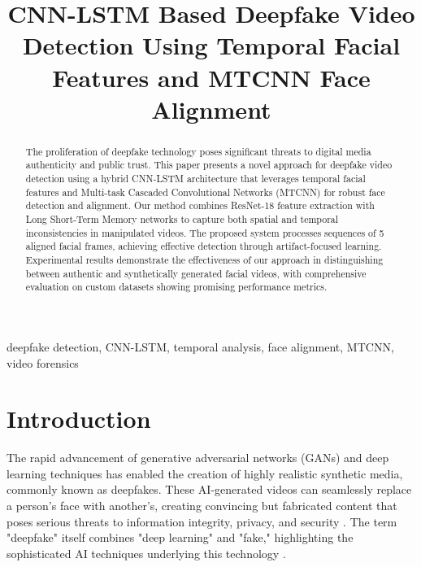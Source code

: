 \documentclass[conference]{IEEEtran}
\begin{document}
\title{CNN-LSTM Based Deepfake Video Detection Using Temporal Facial Features and MTCNN Face Alignment}

\author{
}

\maketitle

\begin{abstract}
The proliferation of deepfake technology poses significant threats to digital media authenticity and public trust. This paper presents a novel approach for deepfake video detection using a hybrid CNN-LSTM architecture that leverages temporal facial features and Multi-task Cascaded Convolutional Networks (MTCNN) for robust face detection and alignment. Our method combines ResNet-18 feature extraction with Long Short-Term Memory networks to capture both spatial and temporal inconsistencies in manipulated videos. The proposed system processes sequences of 5 aligned facial frames, achieving effective detection through artifact-focused learning. Experimental results demonstrate the effectiveness of our approach in distinguishing between authentic and synthetically generated facial videos, with comprehensive evaluation on custom datasets showing promising performance metrics.
\end{abstract}

\begin{IEEEkeywords}
deepfake detection, CNN-LSTM, temporal analysis, face alignment, MTCNN, video forensics
\end{IEEEkeywords}

\section{Introduction}

The rapid advancement of generative adversarial networks (GANs) \cite{goodfellow2014generative} and deep learning techniques has enabled the creation of highly realistic synthetic media, commonly known as deepfakes. These AI-generated videos can seamlessly replace a person's face with another's, creating convincing but fabricated content that poses serious threats to information integrity, privacy, and security \cite{rossler2019faceforensics}. The term "deepfake" itself combines "deep learning" and "fake," highlighting the sophisticated AI techniques underlying this technology \cite{westerlund2019emergence}.
\end{document}

